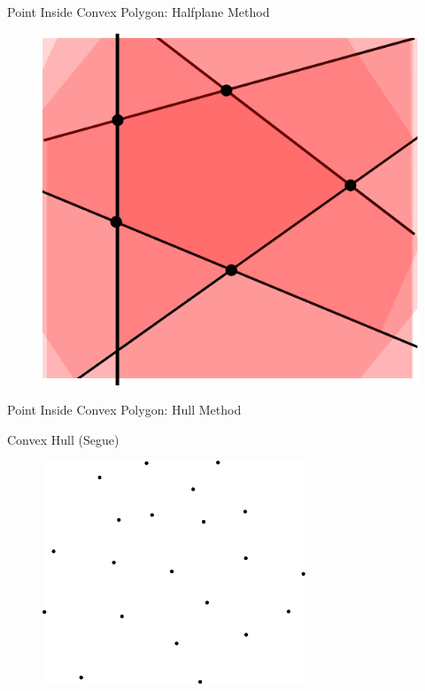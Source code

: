 \documentclass{beamer}
\begin{document}
\begin{frame}{Point Inside Convex Polygon: Halfplane Method}

\begin{figure}[t]
	\centering
	\includegraphics[width=\textwidth]{Halfplane5.pdf}
\end{figure}

\end{frame}


\begin{frame}{Point Inside Convex Polygon: Hull Method}

Convex Hull (Segue) 

\begin{figure}[t]
	\centering
	\includegraphics[width=0.7\textwidth]{ConvexHullExample.pdf}
\end{figure}


\end{frame}
\end{document}
